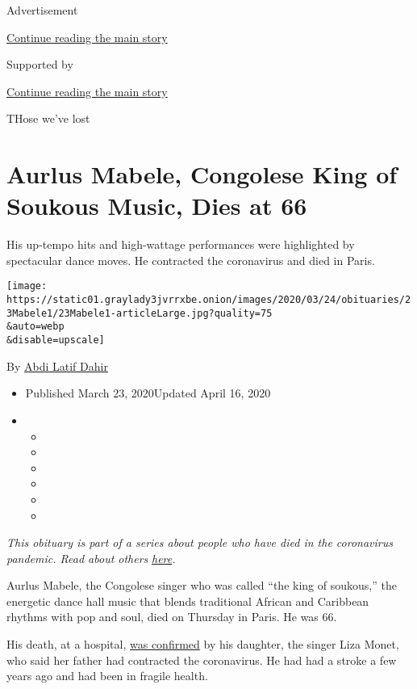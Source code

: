 Advertisement

\protect\hyperlink{after-top}{Continue reading the main story}

Supported by

\protect\hyperlink{after-sponsor}{Continue reading the main story}

THose we've lost

\hypertarget{aurlus-mabele-congolese-king-of-soukous-music-dies-at-66}{%
\section{Aurlus Mabele, Congolese King of Soukous Music, Dies at
66}\label{aurlus-mabele-congolese-king-of-soukous-music-dies-at-66}}

His up-tempo hits and high-wattage performances were highlighted by
spectacular dance moves. He contracted the coronavirus and died in
Paris.

\texttt{[image: https://static01.graylady3jvrrxbe.onion/images/2020/03/24/obituaries/23Mabele1/23Mabele1-articleLarge.jpg?quality=75\\\&auto=webp\\\&disable=upscale]}

By \href{https://www.nytimes3xbfgragh.onion/by/abdi-latif-dahir}{Abdi
Latif Dahir}

\begin{itemize}
\item
  Published March 23, 2020Updated April 16, 2020
\item
  \begin{itemize}
  \item
  \item
  \item
  \item
  \item
  \item
  \end{itemize}
\end{itemize}

\emph{This obituary is part of a series about people who have died in
the coronavirus pandemic. Read about others}
\href{https://www.nytimes3xbfgragh.onion/series/people-who-have-died-of-the-coronavirus}{\emph{here}}\emph{.}

Aurlus Mabele, the Congolese singer who was called ``the king of
soukous,'' the energetic dance hall music that blends traditional
African and Caribbean rhythms with pop and soul, died on Thursday in
Paris. He was 66.

His death, at a hospital,
\href{https://www.facebookcorewwwi.onion/lizamonetofficial/posts/1566001873562459}{was
confirmed} by his daughter, the singer Liza Monet, who said her father
had contracted the coronavirus. He had had a stroke a few years ago and
had been in fragile health.

